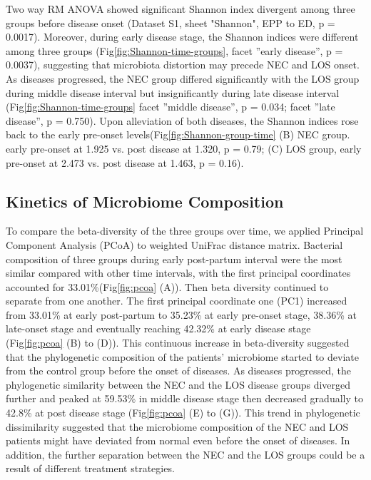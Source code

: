 \documentclass[fleqn,10pt, lineno]{wlpeerj} %
\begin{document}
    Two way RM ANOVA showed significant Shannon index divergent among three groups before disease onset (Dataset S1, sheet "Shannon", EPP to ED, p = 0.0017). Moreover, during early disease stage, the Shannon indices were different among three groups (Fig\ref{fig:Shannon-time-groups}, facet ”early disease”, p = 0.0037), suggesting that microbiota distortion may precede NEC and LOS onset. As diseases progressed, the NEC group differed significantly with the LOS group during middle disease interval but insignificantly  during late disease interval (Fig\ref{fig:Shannon-time-groups} facet ”middle disease”, p = 0.034; facet ”late disease”, p = 0.750). Upon alleviation of both diseases, the Shannon indices rose back to the early pre-onset levels(Fig\ref{fig:Shannon-group-time} (B) NEC group. early pre-onset at 1.925 vs. post disease at 1.320, p = 0.79; (C) LOS group, early pre-onset at 2.473 vs. post disease at 1.463, p = 0.16).


    \subsection*{Kinetics of Microbiome Composition}
    To compare the beta-diversity of the three groups over time, we applied Principal Component Analysis (PCoA) to weighted UniFrac distance matrix.
    Bacterial composition of three groups during early post-partum interval were the most similar compared with other time intervals, with the first principal coordinates accounted for 33.01\%(Fig\ref{fig:pcoa} (A)). Then beta diversity continued to separate from one another. The first principal coordinate one (PC1) increased from 33.01\% at early post-partum to 35.23\% at early pre-onset stage, 38.36\% at late-onset stage and eventually reaching 42.32\% at early disease stage (Fig\ref{fig:pcoa} (B) to (D)).  This continuous increase in beta-diversity suggested that the phylogenetic composition of the patients’ microbiome started to deviate from the control group before the onset of diseases. As diseases progressed, the phylogenetic similarity between the NEC and the LOS disease groups diverged further and peaked at 59.53\% in middle disease stage then decreased gradually to 42.8\% at post disease stage (Fig\ref{fig:pcoa} (E) to (G)). This trend in phylogenetic dissimilarity suggested that the microbiome composition of the NEC and LOS patients might have deviated from normal even before the onset of diseases.  In addition, the further separation between the NEC and the LOS groups could be a result of different treatment strategies.
\end{document}
